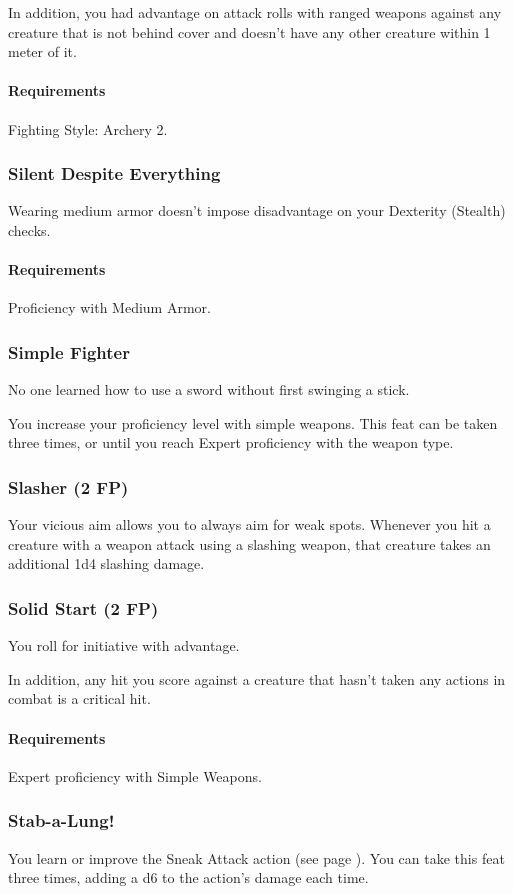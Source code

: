     In addition, you had advantage on attack rolls with ranged weapons against any creature that is not behind cover and doesn't have any other creature within 1 meter of it.
    \paragraph{Requirements} Fighting Style: Archery 2.
\subsubsection{Silent Despite Everything} \label{feat::silentdespiteeverything}
    Wearing medium armor doesn't impose disadvantage on your Dexterity (Stealth) checks.
    \paragraph{Requirements} Proficiency with Medium Armor.
\subsubsection{Simple Fighter} \label{feat::simplefighter}
    No one learned how to use a sword without first swinging a stick.

    You increase your proficiency level with simple weapons.
    This feat can be taken three times, or until you reach Expert proficiency with the weapon type.
\subsubsection{Slasher (2 FP)} \label{feat::slasher}
    Your vicious aim allows you to always aim for weak spots.
    Whenever you hit a creature with a weapon attack using a slashing weapon, that creature takes an additional 1d4 slashing damage.
\subsubsection{Solid Start (2 FP)} \label{feat::solidstart}
    You roll for initiative with advantage.

    In addition, any hit you score against a creature that hasn't taken any actions in combat is a critical hit.
    \paragraph{Requirements} Expert proficiency with Simple Weapons.
\subsubsection{Stab-a-Lung!} \label{feat::stabalung}
    You learn or improve the Sneak Attack action (see page \pageref{act::sneakattack}).
    You can take this feat three times, adding a d6 to the action's damage each time.

